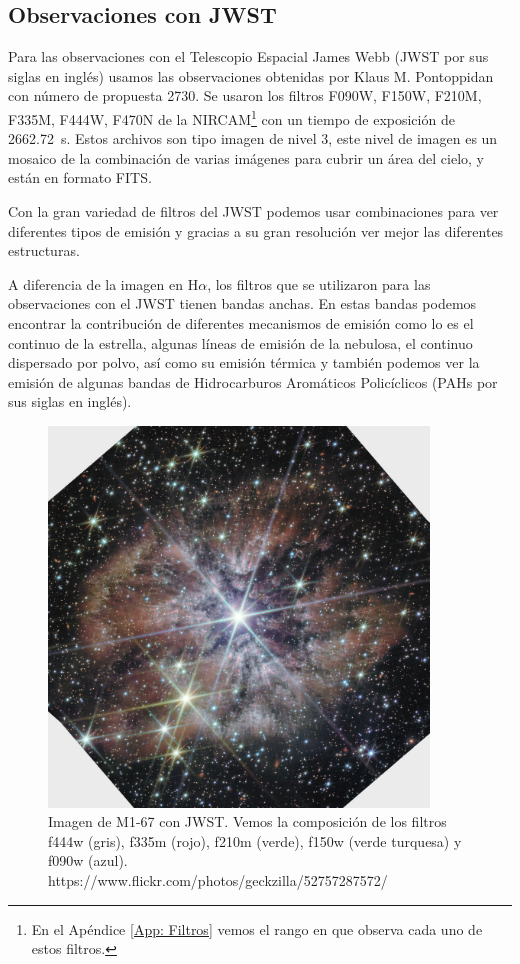 \documentclass{book}
\begin{document}
\subsection{Observaciones con JWST}

Para las observaciones con el Telescopio Espacial James Webb (JWST por sus siglas en inglés) usamos las observaciones obtenidas por Klaus M. Pontoppidan con número de propuesta 2730. Se usaron los filtros F090W, F150W, F210M, F335M, F444W, F470N de la NIRCAM\footnote{En el Apéndice \ref{App: Filtros} vemos el rango en que observa cada uno de estos filtros.} con un tiempo de exposición de \SI{2662.72}{s}. Estos archivos son tipo imagen de nivel 3, este nivel de imagen es un mosaico de la combinación de varias imágenes para cubrir un área del cielo, y están en formato FITS.

Con la gran variedad de filtros del JWST podemos usar combinaciones para ver diferentes tipos de emisión y gracias a su gran resolución ver mejor las diferentes estructuras.

A diferencia de la imagen en H$\alpha$, los filtros que se utilizaron para las observaciones con el JWST tienen bandas anchas. En estas bandas podemos encontrar la contribución de diferentes mecanismos de emisión como lo es el continuo de la estrella, algunas líneas de emisión de la nebulosa, el continuo dispersado por polvo, así como su emisión térmica y también podemos ver la emisión de algunas bandas de Hidrocarburos Aromáticos Policíclicos  (PAHs por sus siglas en inglés).

\begin{figure}[htb]
    \centering
    \includegraphics[width=0.9\textwidth]{M1-67-JWST.jpg}
    \caption{Imagen de M1-67 con JWST. Vemos la composición de los filtros f444w (gris), f335m (rojo), f210m (verde), f150w (verde turquesa) y f090w (azul). https://www.flickr.com/photos/geckzilla/52757287572/}
    \label{fig:M1-67JWST}
\end{figure}
\end{document}
